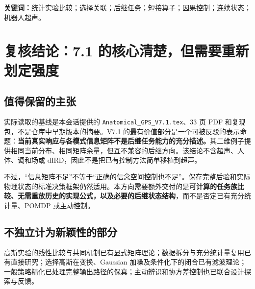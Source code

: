 \documentclass[UTF8,fontset=fandol,11pt,a4paper]{ctexart}
\theoremstyle{definition}\newtheorem{definition}[theorem]{定义}\newtheorem{assumption}[theorem]{条件}
\numberwithin{equation}{section}
\begin{document}
\begin{abstract}
交互程序可能使用局部观测选择持久的物理实现。两个当前实现即使生成相同任务响应并留下相同逐模式信息矩阵，也可能支持不同后继任务。V7.1 用选择关联表达这一现象，但一般相交剩余子空间与连续物理状态尚缺完整接口。本稿首先复核其量词、选择后的概率律和因果动作时序，将创新主张集中于条件实验的后继可实现性，而不把选择高斯滤波或标准协方差优化重新计为原创。针对任意两模式规范指数实验，证明所有非高斯提取自由度均可缩减到两个剩余像空间的交集；一般随机核的存在等价于一组显式正测度卷积及边缘相容关系。对标量阈值选择，进一步得到由短接算子决定的必要矩阵界；两个短接矩阵可比时，该界也是充分条件，涵盖全部一维交集。构造三维例子证明普通投影会错误认证可行性。其次，把真实连续状态与选择变量、规范得分组成联合表示，以控制交叉协方差为变量建立完整当步 SDP，并给出具有相关过程和观测噪声的闭合更新；实际状态被保留，不以统计重采样替代。最后说明材料坐标生成共同任务与观测微分、dIRD 提议物理实现的具体接口，区分无需专家示教、必要标定和在线辨识。精确有理数检查、显式提取采样和含连续状态的八步反馈验证支持本稿构造；一般非可比卷积问题的有限算法、真实非线性扫描和未知模型的精确在线编译仍不被宣称已经完成。
\end{abstract}
\noindent\textbf{关键词：}统计实验比较；选择关联；后继任务；短接算子；因果控制；连续状态；机器人超声。
\clearpage\setcounter{tocdepth}{1}\tableofcontents\clearpage

\section{复核结论：7.1 的核心清楚，但需要重新划定强度}
\label{sec:audit}
\subsection{值得保留的主张}
实际读取的基线是本会话提供的 \texttt{Anatomical\_GPS\_V7.1.tex}、33 页 PDF 和复现包，不是仓库中早期版本的摘要。V7.1 的最有价值部分是一个可被反驳的表示命题：\textbf{当前真实响应与各模式信息矩阵不是后继任务能力的充分描述。}其二维例子提供相同当前分布、相同矩阵余量，但互不兼容的后继方向。该结论不含超声、人体、调和场或 dIRD，因此不是把已有控制方法简单移植到超声。

不过，“信息矩阵不足”不等于“正确的信念空间控制也不足”。保存完整后验和实际物理状态的标准决策框架仍然适用。本方向需要额外交付的是\textbf{可计算的任务族比较、无需重放历史的实现公式，以及必要的后继状态结构}，而不是否定已有充分统计量、POMDP 或主动控制。

\subsection{不独立计为新颖性的部分}
高斯实验的线性比较与共同机制已有显式矩阵理论\cite{xiao}；数据拆分与充分统计量复用已有直接研究\cite{thinning}；选择高斯在变换、Gaussian 加噪及条件化下的闭合已有滤波理论\cite{naveau,selectionkalman}；一般策略精化已处理完整输出路径的保真\cite{hsa}；主动辨识和协方差控制也已联合设计探索与反馈\cite{dual}。
\end{document}
